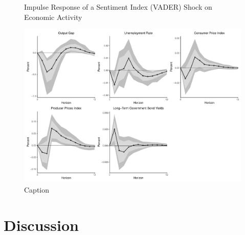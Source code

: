 \begin{figure}
    \centering
    \caption{Impulse Response of a Sentiment Index (VADER) Shock on Economic Activity}
    \includegraphics[width=\textwidth]{images/irf_lm.pdf}
    \caption{Caption}
    \label{fig:my_label}
\end{figure}

\section{Discussion}
